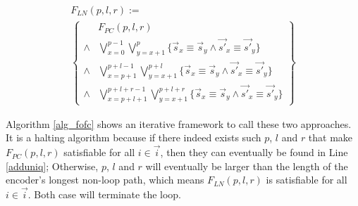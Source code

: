 \documentclass[conference]{IEEEtran}
\begin{document}
\begin{multline}\label{uniqln}
F_{LN}(p,l,r):=\\
\left\{
\begin{array}{cc}
&F_{PC}(p,l,r)\\
\wedge&\bigvee_{x=0}^{p-1}\bigvee_{y=x+1}^{p} \{\vec{s}_x\equiv \vec{s}_y\wedge \vec{s'}_x\equiv \vec{s'}_y\} \\
\wedge&\bigvee_{x=p+1}^{p+l-1}\bigvee_{y=x+1}^{p+l} \{\vec{s}_x\equiv \vec{s}_y\wedge \vec{s'}_x\equiv \vec{s'}_y\} \\
\wedge&\bigvee_{x=p+l+1}^{p+l+r-1}\bigvee_{y=x+1}^{p+l+r} \{\vec{s}_x\equiv \vec{s}_y\wedge \vec{s'}_x\equiv \vec{s'}_y\}
\end{array}
\right\}
\end{multline}

Algorithm \ref{alg_fofc} shows an iterative framework to call these two approaches.
It is a halting algorithm because if there indeed exists such $p$, $l$ and $r$ that make $F_{PC}(p,l,r)$ satisfiable for all $i\in\vec{i}$,
then they can eventually be found in Line \ref{adduniq};
Otherwise,
$p$, $l$ and $r$ will eventually be larger than the length of the encoder's longest non-loop path,
which means $F_{LN}(p,l,r)$ is satisfiable for all $i\in\vec{i}$.
Both case will terminate the loop.



% 
% 
\end{document}
